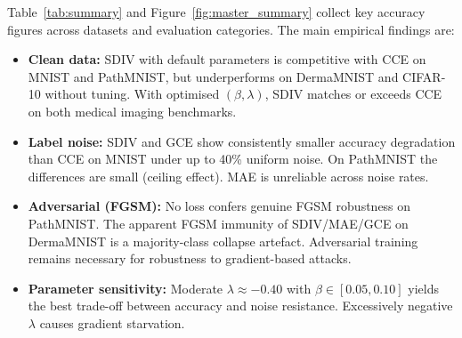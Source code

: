 Table~\ref{tab:summary} and Figure~\ref{fig:master_summary} collect key
accuracy figures across datasets and evaluation categories.
The main empirical findings are:
\begin{itemize}[leftmargin=*,itemsep=2pt]
  \item \textbf{Clean data:} SDIV with default parameters is competitive
        with CCE on MNIST and PathMNIST, but underperforms on DermaMNIST
        and CIFAR-10 without tuning. With optimised $(\beta,\lambda)$,
        SDIV matches or exceeds CCE on both medical imaging benchmarks.

  \item \textbf{Label noise:} SDIV and GCE show consistently smaller
        accuracy degradation than CCE on MNIST under up to 40\% uniform
        noise. On PathMNIST the differences are small (ceiling effect).
        MAE is unreliable across noise rates.

  \item \textbf{Adversarial (FGSM):} No loss confers genuine FGSM
        robustness on PathMNIST. The apparent FGSM immunity of SDIV/MAE/GCE
        on DermaMNIST is a majority-class collapse artefact. Adversarial
        training remains necessary for robustness to gradient-based attacks.

  \item \textbf{Parameter sensitivity:} Moderate $\lambda \approx -0.40$
        with $\beta \in [0.05, 0.10]$ yields the best trade-off between
        accuracy and noise resistance. Excessively negative $\lambda$
        causes gradient starvation.
\end{itemize}

%
%

